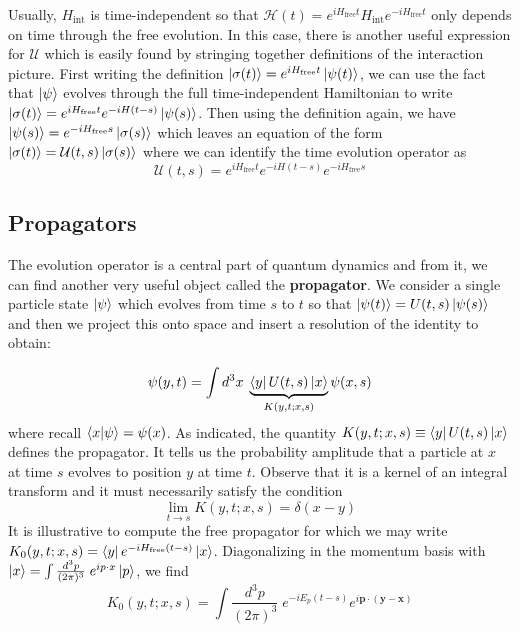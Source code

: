 \documentclass[onecolumn]{gwclass}
\def \*#1{\boldsymbol{#1}}
\renewcommand{\t}[1]{\text{#1}}
\begin{document}
Usually, $H_\t{int}$ is time-independent so that $\mathcal{H}(t)=e^{iH_\t{free}t}H_\t{int}e^{-iH_\t{free}t}$ only depends on time through the free evolution. In this case, there is another useful expression for $\mathcal{U}$ which is easily found by stringing together definitions of the interaction picture. First writing the definition $\ket{\sigma(t)}=e^{iH_\t{free}t}\ket{\psi(t)}$, we can use the fact that $\ket{\psi}$ evolves through the full time-independent Hamiltonian to write $\ket{\sigma(t)}=e^{iH_\t{free}t}e^{-iH(t-s)}\ket{\psi(s)}$. Then using the definition again, we have $\ket{\psi(s)}=e^{-iH_\t{free}s}\ket{\sigma(s)}$ which leaves an equation of the form $\ket{\sigma(t)}=\mathcal{U}(t,s)\ket{\sigma(s)}$ where we can identify the time evolution operator as
$$ \mathcal{U}(t,s) = e^{iH_\t{free}t}e^{-iH(t-s)}e^{-iH_\t{free}s} $$


\subsection{Propagators}
The evolution operator is a central part of quantum dynamics and from it, we can find another very useful object called the \textbf{propagator}. We consider a single particle state $\ket{\psi}$ which evolves from time $s$ to $t$ so that $\ket{\psi(t)}=U(t,s)\ket{\psi(s)}$ and then we project this onto space and insert a resolution of the identity to obtain:

$$ \psi(y,t) = \int d^3x\; \underbrace{\bra{y}U(t,s)\ket{x}}_{K(y,t;x,s)}\psi(x,s) $$
where recall $\bra{x}\ket{\psi}=\psi(x)$. As indicated, the quantity $K(y,t;x,s)\equiv \bra{y}U(t,s)\ket{x}$ defines the propagator. It tells us the probability amplitude that a particle at $x$ at time $s$ evolves to position $y$ at time $t$. Observe that it is a kernel of an integral transform and it must necessarily satisfy the condition
$$ \lim_{t\to s} K(y,t;x,s) = \delta(x-y) $$
It is illustrative to compute the free propagator for which we may write $ K_0(y,t;x,s) = \bra{y}e^{-iH_\t{free}(t-s)}\ket{x} $. Diagonalizing in the momentum basis with $\ket{x} = \int \frac{d^3p}{(2\pi)^3}\;e^{ip\cdot x}\ket{p}$, we find
$$ K_0(y,t;x,s) = \int\frac{d^3p}{(2\pi)^3}\;e^{-iE_p(t-s)}e^{i\*p\cdot(\*y-\*x)} $$


\newpage
\end{document}

